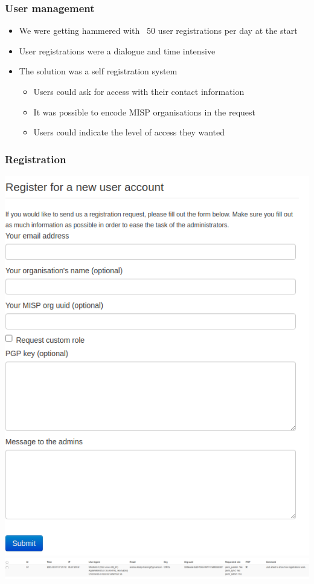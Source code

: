 \begin{frame}
    \frametitle{User management}
 \begin{itemize}
         \item We were getting hammered with ~50 user registrations per day at the start
         \item User registrations were a dialogue and time intensive
         \item The solution was a self registration system
         \begin{itemize}
              \item Users could ask for access with their contact information
              \item It was possible to encode MISP organisations in the request
              \item Users could indicate the level of access they wanted
         \end{itemize}
 \end{itemize}
\end{frame}

\begin{frame}
    \frametitle{Registration}
    \includegraphics[width=0.50\linewidth]{registration1.png}
    \includegraphics[width=1.00\linewidth]{registration2.png}
\end{frame}

